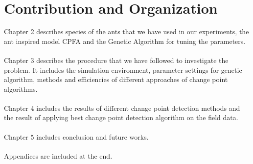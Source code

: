\section{\label{section:Contribution and Organization}Contribution and Organization}
Chapter 2 describes species of the ants that we have used in our experiments, the ant inspired model CPFA and the Genetic Algorithm for tuning the parameters.\\
\\
Chapter 3 describes the procedure that we have followed to investigate the problem. It includes the simulation environment, parameter settings for genetic algorithm, methods and efficiencies of different approaches of change point algorithms. \\
\\
Chapter 4 includes the results of different change point detection methods and the result of applying best change point detection algorithm on the field data. \\
\\
Chapter 5 includes conclusion and future works. \\
\\
Appendices are included at the end.
